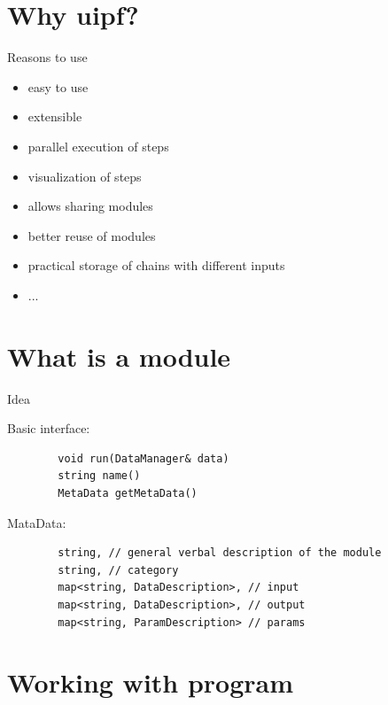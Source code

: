 \documentclass{beamer}
\begin{document}
\section{Why uipf?}
\begin{frame}{Reasons to use}

	\begin{itemize}
		\item easy to use \pause
		\item extensible \pause
		\item parallel execution of steps \pause
		\item visualization of steps \pause
		\item allows sharing modules \pause
		\item better reuse of modules \pause
		\item practical storage of chains with different inputs \pause
		\item ...
	\end{itemize}


\end{frame}

\section{What is a module}
\begin{frame}[fragile]{Idea}

	Basic interface:
	\begin{lstlisting}
		void run(DataManager& data)
		string name()
		MetaData getMetaData()
	\end{lstlisting}

 	MataData:
	\begin{lstlisting}
		string, // general verbal description of the module
		string, // category
		map<string, DataDescription>, // input
		map<string, DataDescription>, // output
		map<string, ParamDescription> // params
	\end{lstlisting}



\end{frame}

\section{Working with program}
\end{document}
